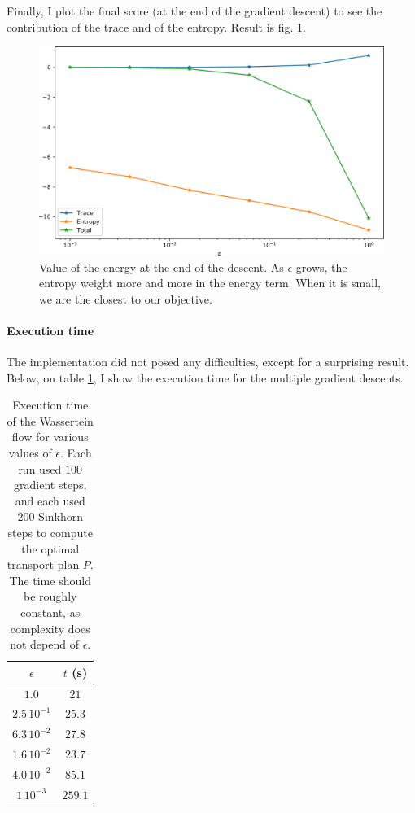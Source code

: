 Finally, I plot the final score (at the end of the gradient descent) to see the contribution of the trace and of the entropy. Result is fig. \ref{fig:score_epsilon_wassertein_flow}.

\begin{figure}[p]
    \centering
    \includegraphics[width=.7\textwidth]{samples/4/evolution_of_score_epsilon.png}
    \caption{Value of the energy at the end of the descent. As $\epsilon$ grows, the entropy weight more and more in the energy term. When it is small, we are the closest to our objective.}
    \label{fig:score_epsilon_wassertein_flow}
\end{figure}

\paragraph{Execution time} The implementation did not posed any difficulties, except for a surprising result. Below, on table \ref{tab:execution_time}, I show the execution time for the multiple gradient descents.

\begin{table}[h]
\centering
\begin{tabular}{cc}
$\epsilon$    & $t$ (s) \\
\hline
$1.0$         & $21$    \\
$2.5 \, 10^{-1}$ & $25.3$  \\
$6.3 \, 10^{-2}$ & $27.8$  \\
$1.6 \, 10^{-2}$ & $23.7$  \\
$4.0 \, 10^{-2}$ & $85.1$  \\
$1 \, 10^{-3}$   & $259.1$
\end{tabular}
\caption{Execution time of the Wassertein flow for various values of $\epsilon$. Each run used $100$ gradient steps, and each used $200$ Sinkhorn steps to compute the optimal transport plan $P$. The time should be roughly constant, as complexity does not depend of $\epsilon$.}
\label{tab:execution_time}
\end{table}

